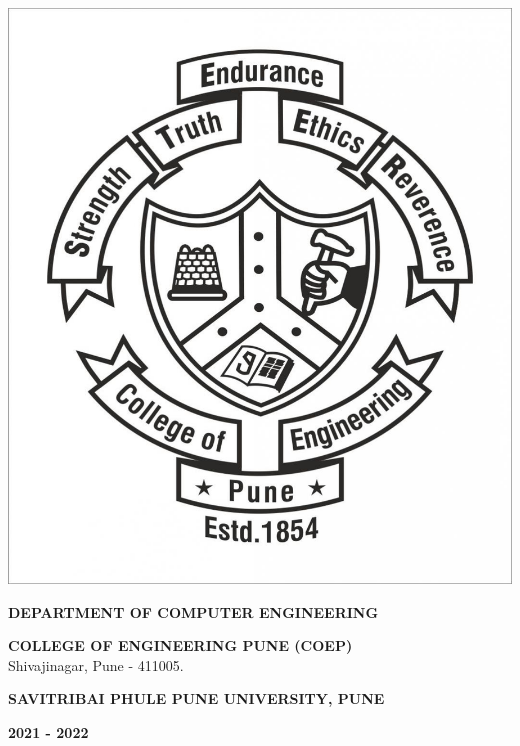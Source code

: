 \documentclass{report} %
\begin{document}
\begin{titlepage}
\begin{center}
			\includegraphics[scale=0.1]{images/college logo.jpg}
			\vspace{1cm}
			
			\textbf {DEPARTMENT OF COMPUTER ENGINEERING} \\
			\vspace{0.5cm}
			
			\textbf {COLLEGE OF ENGINEERING PUNE (COEP)} \\
			Shivajinagar, Pune - 411005. \\
			\vspace{2cm}
			
			\textbf {SAVITRIBAI PHULE PUNE UNIVERSITY, PUNE} \\
			\vspace{0.5cm}
			
			\textbf {2021 - 2022}
		\end{center}
	
	\end{titlepage}	

	
\end{document}
